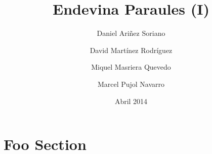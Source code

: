 \documentclass[a4paper]{scrartcl}
\title{Endevina Paraules (I)}
\date{Abril 2014}
\author{Daniel Ariñez Soriano}
\author{David Martínez Rodríguez}
\author{Miquel Masriera Quevedo}
\author{Marcel Pujol Navarro\vspace{11cm}}
\affil{Arquitectura del Software\\Facultat d'Informàtica de Barcelona, UPC}
\begin{document}
	
	\maketitle
	\newpage
	\tableofcontents %
	\cleardoublepage

\section{Foo Section} 


\nocite{*}


\end{document}

